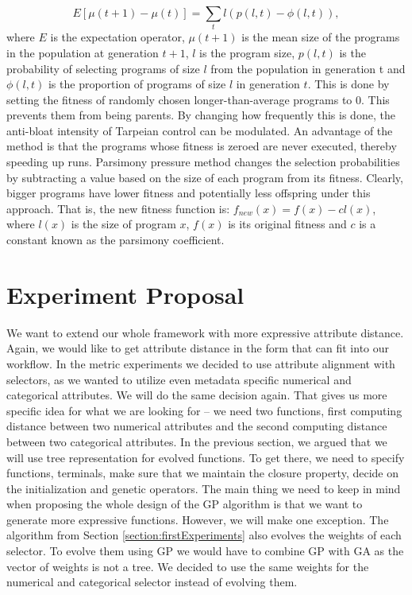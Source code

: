 \begin{enumerate}
\begin{equation}
 	E[\mu(t+1)-\mu(t)]=\sum_{t}l(p(l,t)-\phi(l,t)),
 	\end{equation}
 	where $E$ is the expectation operator, $\mu(t+1)$ is the mean size of the programs in the population at generation $t+1$, $l$ is the program size, $p(l,t)$ is the probability of selecting programs of size $l$ from the population in generation t and $\phi(l,t)$ is the proportion of programs of size $l$ in generation $t$. This is done by setting the fitness of randomly chosen longer-than-average programs to 0. This prevents them from being parents. By changing how frequently this is done, the anti-bloat intensity of Tarpeian control can be modulated. An advantage of the method is that the programs whose fitness is zeroed are never executed, thereby speeding up runs. Parsimony pressure method \cite{KozaGP} changes the selection probabilities by subtracting a value based on the size of each program from its fitness. Clearly, bigger programs have lower fitness and potentially less offspring under this approach. That is, the new fitness function is:
 	$f_{new}(x)  = f(x)-c l(x)$, 
 	where $l(x)$  is the size of program $x$, $f(x)$ is its original fitness and $c$ is a constant known as the parsimony coefficient.
 \end{enumerate} 
 
 \section{Experiment Proposal}
 \label{section:relaxationExperiments}
 We want to extend our whole framework with more expressive attribute distance. Again, we would like to get attribute distance in the form that can fit into our workflow. In the metric experiments we decided to use attribute alignment with selectors, as we wanted to utilize even metadata specific numerical and categorical attributes. We will do the same decision again. That gives us more specific idea for what we are looking for -- we need two functions, first computing distance between two numerical attributes and the second computing distance between two categorical attributes. In the previous section, we argued that we will use tree representation for evolved functions. To get there, we need to specify functions, terminals, make sure that we maintain the closure property, decide on the initialization and genetic operators. The main thing we need to keep in mind when proposing the whole design of the GP algorithm is that we want to generate more expressive functions. However, we will make one exception. The algorithm from Section \ref{section:firstExperiments} also evolves the weights of each selector. To evolve them using GP we would have to combine GP with GA as the vector of weights is not a tree. We decided to use the same weights for the numerical and categorical selector instead of evolving them.
 
